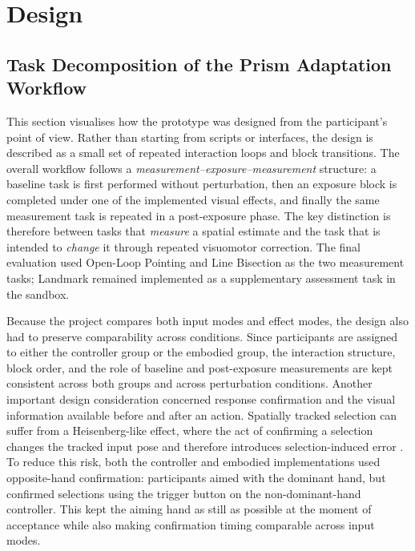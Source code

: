 \chapter{Design}
\label{chap:Design}

\section{Task Decomposition of the Prism Adaptation Workflow}
\label{sec:task-decomposition}

This section visualises how the prototype was designed from the participant's point of view. Rather than starting from scripts or interfaces, the design is described as a small set of repeated interaction loops and block transitions. The overall workflow follows a \emph{measurement--exposure--measurement} structure: a baseline task is first performed without perturbation, then an exposure block is completed under one of the implemented visual effects, and finally the same measurement task is repeated in a post-exposure phase. The key distinction is therefore between tasks that \emph{measure} a spatial estimate and the task that is intended to \emph{change} it through repeated visuomotor correction. The final evaluation used Open-Loop Pointing and Line Bisection as the two measurement tasks; Landmark remained implemented as a supplementary assessment task in the sandbox.

Because the project compares both input modes and effect modes, the design also had to preserve comparability across conditions. Since participants are assigned to either the controller group or the embodied group, the interaction structure, block order, and the role of baseline and post-exposure measurements are kept consistent across both groups and across perturbation conditions. Another important design consideration concerned response confirmation and the visual information available before and after an action. Spatially tracked selection can suffer from a Heisenberg-like effect, where the act of confirming a selection changes the tracked input pose and therefore introduces selection-induced error \cite{wolf2020understanding}. To reduce this risk, both the controller and embodied implementations used opposite-hand confirmation: participants aimed with the dominant hand, but confirmed selections using the trigger button on the non-dominant-hand controller. This kept the aiming hand as still as possible at the moment of acceptance while also making confirmation timing comparable across input modes.

